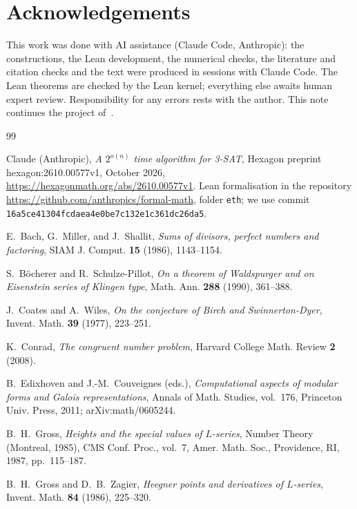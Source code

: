 \documentclass[10pt]{amsart}
\theoremstyle{plain}
\theoremstyle{definition}
\theoremstyle{remark}
\numberwithin{equation}{section}
\begin{document}
\section*{Acknowledgements}
This work was done with AI assistance (Claude Code, Anthropic): the constructions, the Lean development, the
numerical checks, the literature and citation checks and the text were produced in sessions with Claude Code. The
Lean theorems are checked by the Lean kernel; everything else awaits human expert review. Responsibility for any
errors rests with the author. This note continues the project of~\cite{Tul26,TulFac26,TulCN26,TulPar26}.

\begin{thebibliography}{99}

Claude (Anthropic), \emph{A $2^{o(n)}$ time algorithm for {3-SAT}}, Hexagon preprint hexagon:2610.00577v1,
October 2026, \url{https://hexagonmath.org/abs/2610.00577v1}. Lean formalisation in the repository
\url{https://github.com/anthropics/formal-math}, folder \texttt{eth}; we use commit
\texttt{16a5ce41304fcdaea4e0be7c132e1c361dc26da5}.

E.~Bach, G.~Miller, and J.~Shallit, \emph{Sums of divisors, perfect numbers and factoring}, SIAM J. Comput.
\textbf{15} (1986), 1143--1154.

S.~B\"ocherer and R.~Schulze-Pillot, \emph{On a theorem of {W}aldspurger and on {E}isenstein series of {K}lingen
type}, Math. Ann. \textbf{288} (1990), 361--388.

J.~Coates and A.~Wiles, \emph{On the conjecture of {B}irch and {S}winnerton-{D}yer}, Invent. Math. \textbf{39}
(1977), 223--251.

K.~Conrad, \emph{The congruent number problem}, Harvard College Math. Review \textbf{2} (2008).

B.~Edixhoven and J.-M.~Couveignes (eds.), \emph{Computational aspects of modular forms and {G}alois
representations}, Annals of Math. Studies, vol.~176, Princeton Univ. Press, 2011; arXiv:math/0605244.

B.~H.~Gross, \emph{Heights and the special values of {$L$}-series}, Number Theory (Montreal, 1985), CMS Conf.
Proc., vol.~7, Amer. Math. Soc., Providence, RI, 1987, pp.~115--187.

B.~H.~Gross and D.~B.~Zagier, \emph{Heegner points and derivatives of {$L$}-series}, Invent. Math. \textbf{84}
(1986), 225--320.


\end{thebibliography}
\end{document}
